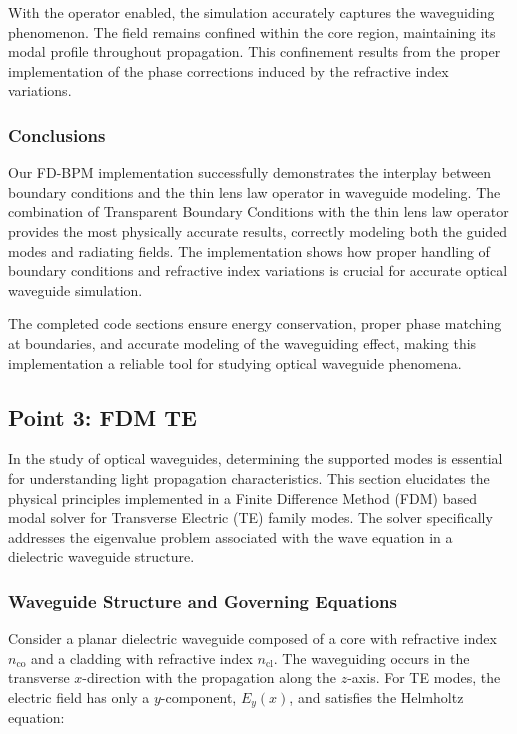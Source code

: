 \documentclass{article}
\begin{document}
With the operator enabled, the simulation accurately captures the waveguiding phenomenon. The field remains confined within the core region, maintaining its modal profile throughout propagation. This confinement results from the proper implementation of the phase corrections induced by the refractive index variations.

\subsubsection{Conclusions}
Our FD-BPM implementation successfully demonstrates the interplay between boundary conditions and the thin lens law operator in waveguide modeling. The combination of Transparent Boundary Conditions with the thin lens law operator provides the most physically accurate results, correctly modeling both the guided modes and radiating fields. The implementation shows how proper handling of boundary conditions and refractive index variations is crucial for accurate optical waveguide simulation.

The completed code sections ensure energy conservation, proper phase matching at boundaries, and accurate modeling of the waveguiding effect, making this implementation a reliable tool for studying optical waveguide phenomena.





\subsection{Point 3: FDM TE}

In the study of optical waveguides, determining the supported modes is essential for understanding light propagation characteristics. This section elucidates the physical principles implemented in a Finite Difference Method (FDM) based modal solver for Transverse Electric (TE) family modes. The solver specifically addresses the eigenvalue problem associated with the wave equation in a dielectric waveguide structure.

\subsubsection{Waveguide Structure and Governing Equations}

Consider a planar dielectric waveguide composed of a core with refractive index $n_{\text{co}}$ and a cladding with refractive index $n_{\text{cl}}$. The waveguiding occurs in the transverse $x$-direction with the propagation along the $z$-axis. For TE modes, the electric field has only a $y$-component, $E_y(x)$, and satisfies the Helmholtz equation:
\end{document}
